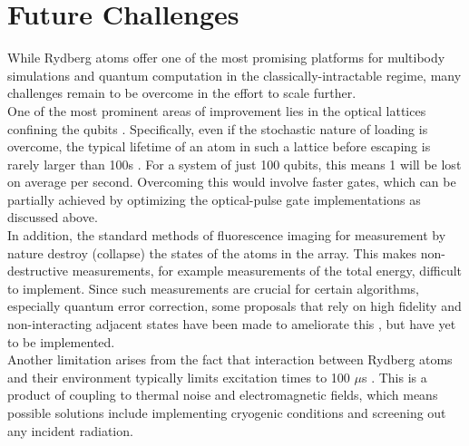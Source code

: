 \documentclass[aps,twocolumn,preprintnumbers]{revtex4}
\begin{document}
\section{Future Challenges}

While Rydberg atoms offer one of the most promising platforms for multibody simulations and quantum computation in the classically-intractable regime, many challenges remain to be overcome in the effort to scale further.\\
One of the most prominent areas of improvement lies in the optical lattices confining the qubits \cite{concise}. Specifically, even if the stochastic nature of loading is overcome, the typical lifetime of an atom in such a lattice before escaping is rarely larger than 100s \cite{gates}. For a system of just 100 qubits, this means 1 will be lost on average per second. Overcoming this would involve faster gates, which can be partially achieved by optimizing the optical-pulse gate implementations as discussed above.\\
In addition, the standard methods of fluorescence imaging for measurement by nature destroy (collapse) the states of the atoms in the array. This makes non-destructive measurements, for example measurements of the total energy, difficult to implement. Since such measurements are crucial for certain algorithms, especially quantum error correction, some proposals that rely on high fidelity and non-interacting adjacent states have been made to ameliorate this \cite{demol}, but have yet to be implemented.\\
Another limitation arises from the fact that interaction between Rydberg atoms and their environment typically limits excitation times to 100 $\mu$s \cite{gates}. This is a product of coupling to thermal noise and electromagnetic fields, which means possible solutions include implementing cryogenic conditions and screening out any incident radiation. 
\end{document}
